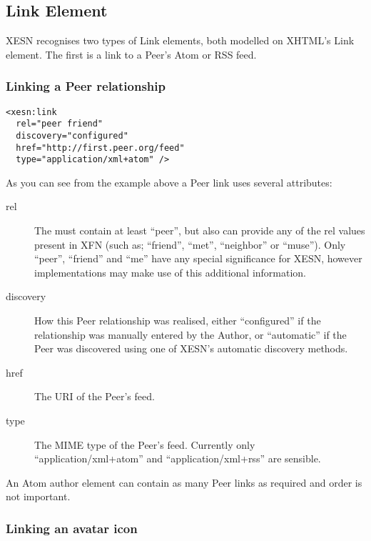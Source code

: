 \documentclass[titlepage,english,a4paper,twoside,dvips]{article}
\begin{document}
\subsection{Link Element}

XESN recognises two types of Link elements, both modelled on XHTML's Link element.  The first is a link to a Peer's Atom or RSS feed.

\subsubsection{Linking a Peer relationship}

\begin{verbatim}
<xesn:link 
  rel="peer friend" 
  discovery="configured" 
  href="http://first.peer.org/feed" 
  type="application/xml+atom" />
\end{verbatim}

As you can see from the example above a Peer link uses several attributes:

\begin{description}

\item[rel] The must contain at least ``peer'', but also can provide any of the rel values present in XFN (such as; ``friend'', ``met'', ``neighbor'' or ``muse'').  Only ``peer'', ``friend'' and ``me'' have any special significance for XESN, however implementations may make use of this additional information.

\item[discovery] How this Peer relationship was realised, either ``configured'' if the relationship was manually entered by the Author, or ``automatic'' if the Peer was discovered using one of XESN's automatic discovery methods. 

\item[href] The URI of the Peer's feed.

\item[type] The MIME type of the Peer's feed.  Currently only ``application/xml+atom'' and ``application/xml+rss'' are sensible.

\end{description}

An Atom author element can contain as many Peer links as required and order is not important.

\subsubsection{Linking an avatar icon}
\end{document}
